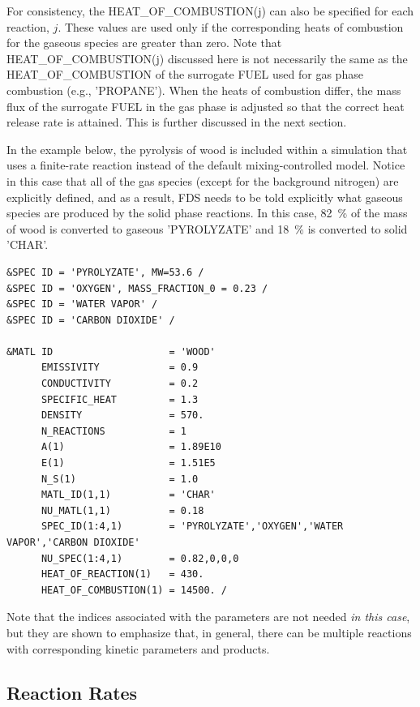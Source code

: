 \documentclass[11pt]{book}
\begin{document}
For consistency, the {\ct HEAT\_OF\_COMBUSTION(j)} can also be specified for each reaction, $j$. These values are used only if the corresponding heats of combustion for the gaseous species are greater than zero.  Note that {\ct HEAT\_OF\_COMBUSTION(j)} discussed here is not necessarily the same as the {\ct HEAT\_OF\_COMBUSTION} of the surrogate {\ct FUEL} used for gas phase combustion (e.g., {\ct 'PROPANE'}).  When the heats of combustion differ, the mass flux of the surrogate {\ct FUEL} in the gas phase is adjusted so that the correct heat release rate is attained.  This is further discussed in the next section.

In the example below, the pyrolysis of wood is included within a simulation that uses a finite-rate reaction instead of the default mixing-controlled model. Notice in this case that all of the gas species (except for the background nitrogen) are explicitly defined, and as a result, FDS needs to be told explicitly what gaseous species are produced by the solid phase reactions. In this case, 82~\% of the mass of wood is converted to gaseous {\ct 'PYROLYZATE'} and 18~\% is converted to solid {\ct 'CHAR'}.
\begin{lstlisting}
&SPEC ID = 'PYROLYZATE', MW=53.6 /
&SPEC ID = 'OXYGEN', MASS_FRACTION_0 = 0.23 /
&SPEC ID = 'WATER VAPOR' /
&SPEC ID = 'CARBON DIOXIDE' /

&MATL ID                    = 'WOOD'
      EMISSIVITY            = 0.9
      CONDUCTIVITY          = 0.2
      SPECIFIC_HEAT         = 1.3
      DENSITY               = 570.
      N_REACTIONS           = 1
      A(1)                  = 1.89E10
      E(1)                  = 1.51E5
      N_S(1)                = 1.0
      MATL_ID(1,1)          = 'CHAR'
      NU_MATL(1,1)          = 0.18
      SPEC_ID(1:4,1)        = 'PYROLYZATE','OXYGEN','WATER VAPOR','CARBON DIOXIDE'
      NU_SPEC(1:4,1)        = 0.82,0,0,0
      HEAT_OF_REACTION(1)   = 430.
      HEAT_OF_COMBUSTION(1) = 14500. /
\end{lstlisting}
Note that the indices associated with the parameters are not needed {\em in this case}, but they are shown to emphasize that, in general, there can be multiple reactions with corresponding kinetic parameters and products.

\subsection{Reaction Rates}
\end{document}
